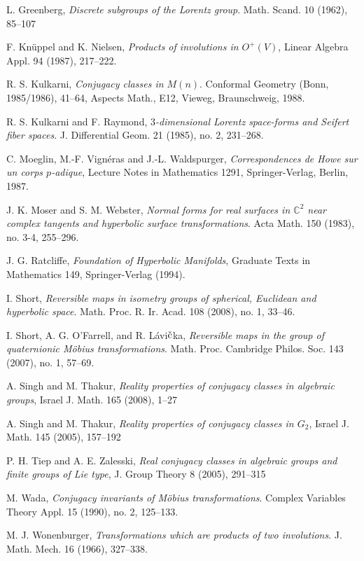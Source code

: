 \documentclass[11pt]{amsart}
\theoremstyle{definition}
\theoremstyle{remark}
\numberwithin{equation}{section}
\theoremstyle{plain}
\begin{document}
\begin{thebibliography}{99}
L. Greenberg, {\it Discrete subgroups of the Lorentz group}.  Math. Scand.  10  (1962), 85--107

F. Kn\"uppel and K. Nielsen, {\it Products of involutions in $O^+(V)$},  Linear Algebra Appl. 94 (1987), 217--222. 

 R. S. Kulkarni, {\it Conjugacy classes in $M(n)$}. 
Conformal Geometry (Bonn, 1985/1986), 41--64, Aspects Math., E12, Vieweg, 
Braunschweig, 1988. 

 R. S. Kulkarni and F. Raymond, 
{\it $3$-dimensional Lorentz space-forms and Seifert fiber spaces}.
 J. Differential Geom. 21 (1985), no. 2, 231--268. 

C. Moeglin, M.-F. Vign\'eras and J.-L. Waldspurger,  {\it Correspondences de Howe sur un corps $p$-adique}, Lecture Notes in Mathematics 1291, Springer-Verlag, Berlin, 1987.

 J. K. Moser and S. M. Webster, {\it Normal forms for real surfaces in ${\mathbb C}^{2}$ near complex tangents and hyperbolic surface transformations}. Acta Math. 150 (1983), no. 3-4, 255--296. 

J. G. Ratcliffe, {\it Foundation of Hyperbolic Manifolds}, Graduate Texts in Mathematics 149, Springer-Verlag (1994).

 I. Short, {\it Reversible maps in isometry groups of spherical, Euclidean and hyperbolic space}.  Math. Proc. R. Ir. Acad.  108  (2008),  no. 1, 33--46.

 I. Short, A. G. O'Farrell, and R. L\'avi$\check{\hbox{c}}$ka, {\it Reversible maps in the group of quaternionic M\"obius transformations}.  Math. Proc. Cambridge Philos. Soc.  143  (2007),  no. 1, 57--69. 

A. Singh and M. Thakur, {\it Reality properties of conjugacy classes in algebraic groups}, Israel J. Math.  165  (2008), 1--27

 A. Singh and M. Thakur, {\it Reality properties of conjugacy classes in $G_2$},  Israel J. Math.  145  (2005), 157--192

 P. H. Tiep and A. E. Zalesski, {\it Real conjugacy classes in algebraic groups and finite groups of Lie type}, J. Group Theory 8 (2005), 291--315

 M. Wada, {\it Conjugacy invariants of M\"obius transformations}. Complex Variables Theory Appl. 15 (1990), no. 2, 125--133.

M. J. Wonenburger, {\it Transformations which are products of two involutions}. J. Math. Mech. 16 (1966), 327--338.

\end{thebibliography}
\end{document}
